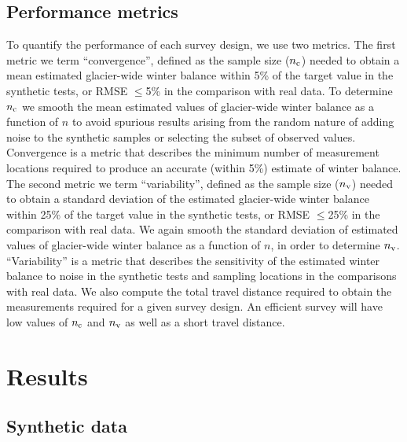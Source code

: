 \documentclass{article}
\begin{document}
 \subsection{Performance metrics}
 
To quantify the performance of each survey design, we use two metrics. The first metric we term ``convergence'', defined as the sample size ($n_{\rm c}$) needed to obtain a mean estimated glacier-wide winter balance within 5\% of the target value in the synthetic tests, or RMSE $\leq$5\% in the comparison with real data. To determine $n_{\rm c}$ we smooth the mean estimated values of glacier-wide winter balance as a function of $n$ to avoid spurious results arising from the random nature of adding noise to the synthetic samples or selecting the subset of observed values.
Convergence is a metric that describes the minimum number of measurement locations required to produce an accurate (within 5\%) estimate of winter balance. The second metric we term ``variability'', defined as the sample size ($n_{\rm v}$) needed to obtain a standard deviation of the estimated glacier-wide winter balance within 25\% of the target value in the synthetic tests, or RMSE $\leq$25\% in the comparison with real data. We again smooth the standard deviation of estimated values of glacier-wide winter balance as a function of $n$, in order to determine $n_{\rm v}$. 
``Variability'' is a metric that describes the sensitivity of the estimated winter balance to noise in the synthetic tests and sampling locations in the comparisons with real data.
We also compute the total travel distance required to obtain the measurements required for a given survey design. An efficient survey will have low values of  $n_{\rm c}$ and $n_{\rm v}$ as well as a short travel distance. 

\section{Results }

\subsection{Synthetic data}
\end{document}
